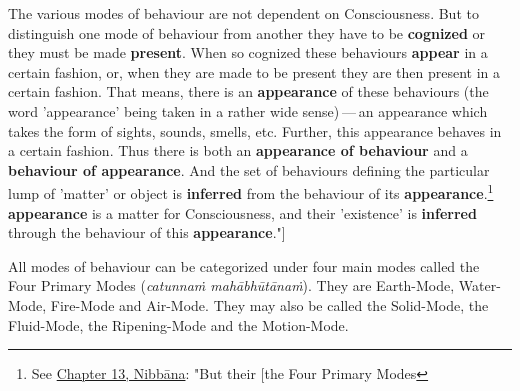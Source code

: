 The various modes of behaviour are not dependent on Consciousness. But
to distinguish one mode of behaviour from another they have to be
\textbf{cognized} or they must be made \textbf{present}. When so cognized these
behaviours \textbf{appear} in a certain fashion, or, when they are made to be
present they are then present in a certain fashion. That means, there is
an \textbf{appearance} of these behaviours (the word 'appearance' being taken
in a rather wide sense) — an appearance which takes the form of sights,
sounds, smells, etc. Further, this appearance behaves in a certain
fashion. Thus there is both an \textbf{appearance of behaviour} and a
\textbf{behaviour of appearance}. And the set of behaviours defining the
particular lump of 'matter' or object is \textbf{inferred} from the behaviour
of its \textbf{appearance}.\footnote{See \hyperlink{ch-13-nibbana#the-four-primary}{Chapter 13, Nibbāna}: "But their [the Four Primary Modes} \textbf{appearance} is a matter for
Consciousness, and their 'existence' is \textbf{inferred} through the
behaviour of this \textbf{appearance}."]


All modes of behaviour can be categorized under four main modes called
the Four Primary Modes (\emph{catunnaṁ mahābhūtānaṁ}). They are Earth-Mode,
Water-Mode, Fire-Mode and Air-Mode. They may also be called the
Solid-Mode, the Fluid-Mode, the Ripening-Mode and the Motion-Mode.


